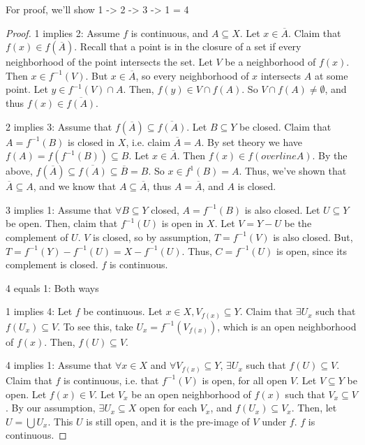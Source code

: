 \documentclass[11pt]{article}
\begin{document}
For proof, we'll show 1 -> 2 -> 3 -> 1 = 4
\begin{proof}
1 implies 2: Assume \(f\) is continuous, and \(A\subseteq X\). Let
\(x\in\overline{A}\). Claim that \(f(x) \in f(\overline{A})\). Recall that
a point is in the closure of a set if every neighborhood of the point
intersects the set. Let \(V\) be a neighborhood of \(f(x)\). Then \(x \in
f^{-1}(V)\). But \(x \in \overline{A}\), so every neighborhood of \(x\)
intersects \(A\) at some point. Let \(y \in f^{-1}(V)\cap A\). Then, \(f(y)
\in V\cap f(A)\). So \(V\cap f(A) \not = \emptyset\), and thus \(f(x) \in
\overline{f(A)}\).

2 implies 3: Assume that \(f(\overline{A}) \subseteq
\overline{f(A)}\). Let \(B\subseteq Y\) be closed. Claim that \(A =
f^{-1}(B)\) is closed in \(X\), i.e. claim \(\overline{A} = A\). By set
theory we have \(f(A) = f(f^{-1}(B)) \subseteq B\). Let \(x \in
\overline{A}\). Then \(f(x) \in f(overline{A})\). By the above,
\(f(\overline{A})\subseteq \overline{f(A)}\subseteq \overline{B} =
B\). So \(x \in f^{1}(B) = A\). Thus, we've shown that \(\overline{A}
\subseteq A\), and we know that \(A \subseteq \overline{A}\), thus \(A =
\overline{A}\), and \(A\) is closed. 

3 implies 1: Assume that \(\forall B\subseteq Y\) closed, \(A =
f^{-1}(B)\) is also closed. Let \(U \subseteq Y\) be open. Then, claim
that \(f^{-1}(U)\) is open in \(X\). Let \(V = Y - U\) be the complement of
\(U\). \(V\) is closed, so by assumption, \(T = f^{-1}(V)\) is also
closed. But, \(T = f^{-1}(Y) - f^{-1}(U) = X - f^{-1}(U)\). Thus, \(C =
f^{-1}(U)\) is open, since its complement is closed. \(f\) is continuous. 

4 equals 1: Both ways

1 implies 4: Let \(f\) be continuous. Let \(x \in X, V_{f(x)}\subseteq
Y\). Claim that \(\exists U_x\) such that \(f(U_x) \subseteq V\). To see
this, take \(U_x = f^{-1}(V_{f(x)})\), which is an open neighborhood of
\(f(x)\). Then, \(f(U) \subseteq V\). 

4 implies 1: Assume that \(\forall x \in X\) and \(\forall V_{f(x)}
\subseteq Y\), \(\exists U_x\) such that \(f(U) \subseteq V\). Claim that
\(f\) is continuous, i.e. that \(f^{-1}(V)\) is open, for all open
\(V\). Let \(V \subseteq Y\) be open. Let \(f(x) \in V\). Let \(V_x\) be an
open neighborhood of \(f(x)\) such that \(V_x \subseteq V\). By our
assumption, \(\exists U_x \subseteq X\) open for each \(V_x\), and \(f(U_x)
\subseteq V_x\). Then, let \(U = \bigcup U_x\). This \(U\) is still open,
and it is the pre-image of \(V\) under \(f\). \(f\) is continuous. 
\end{proof}
\end{document}
